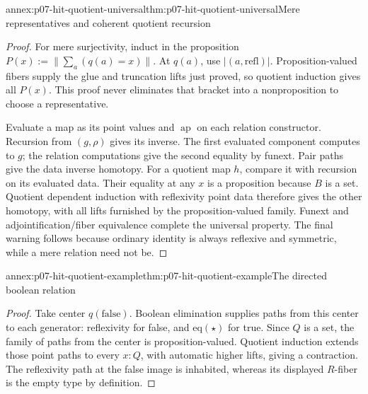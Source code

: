 \begin{annexitem}{annex:p07-hit-quotient-universal}{thm:p07-hit-quotient-universal}{Mere representatives and coherent quotient recursion}
\begin{proof}
For mere surjectivity, induct in the proposition
\(P(x):=\|\sum_a(q(a)=x)\|\). At \(q(a)\), use
\(|(a,\mathrm{refl})|\). Proposition-valued fibers supply the glue and
truncation lifts just proved, so quotient induction gives all \(P(x)\).
This proof never eliminates that bracket into a nonproposition to choose
a representative.

Evaluate a map as its point values and \(\operatorname{ap}\) on each
relation constructor. Recursion from \((g,\rho)\) gives its inverse.
The first evaluated component computes to \(g\); the relation computations
give the second equality by funext. Pair paths give the data inverse
homotopy. For a quotient map \(h\), compare it with recursion on its
evaluated data. Their equality at any \(x\) is a proposition because
\(B\) is a set. Quotient dependent induction with reflexivity point data
therefore gives the other homotopy, with all lifts furnished by the
proposition-valued family. Funext and adjointification/fiber equivalence
complete the universal property. The final warning follows because ordinary
identity is always reflexive and symmetric, while a mere relation need not be.
\end{proof}
\end{annexitem}

\begin{annexitem}{annex:p07-hit-quotient-example}{thm:p07-hit-quotient-example}{The directed boolean relation}
\begin{proof}
Take center \(q(\mathrm{false})\). Boolean elimination supplies paths
from this center to each generator: reflexivity for false, and
\(\mathrm{eq}(\star)\) for true. Since \(Q\) is a set, the family of
paths from the center is proposition-valued. Quotient induction extends
those point paths to every \(x:Q\), with automatic higher lifts, giving
a contraction. The reflexivity path at the false image is inhabited,
whereas its displayed \(R\)-fiber is the empty type by definition.
\end{proof}
\end{annexitem}


